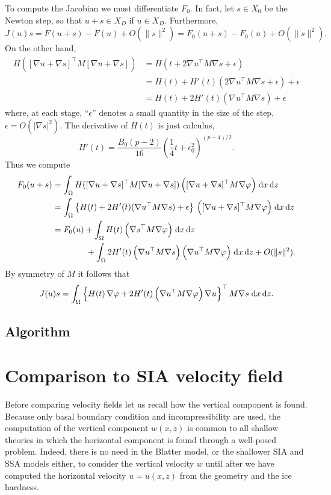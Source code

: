 \documentclass[11pt,final,reqno]{amsart}
\theoremstyle{remark}
\theoremstyle{definition}
\newcommand{\eps}{\epsilon}
\newcommand{\grad}{\nabla}
\begin{document}
To compute the Jacobian we must differentiate $F_0$.  In fact, let $s\in X_0$ be the Newton step, so that $u+s \in X_D$ if $u\in X_D$.  Furthermore,
	$$J(u) s = F(u+s) - F(u) + O(\|s\|^2) = F_0(u+s) - F_0(u) + O(\|s\|^2).$$
On the other hand,
\begin{align*}
  H([\grad u+\grad s]^\top M [\grad u+\grad s]) &= H(t + 2 \grad u^\top M \grad s + \eps) \\
      &=  H(t) + H'(t) (2 \grad u^\top M \grad s + \eps) + \eps \\
      &=  H(t) + 2 H'(t) (\grad u^\top M \grad s) + \eps
\end{align*}
where, at each stage, ``$\eps$'' denotes a small quantity in the size of the step, $\eps = O(|\grad s|^2)$.  The derivative of $H(t)$ is just calculus,
   $$H'(t) = \frac{B_0(p-2)}{16} \left(\frac{1}{4} t + \eps_0^2\right)^{(p-4)/2}.$$
Thus we compute
\begin{align*}
  F_0(u+s) &= \int_\Omega H([\grad u+\grad s]^\top M [\grad u+\grad s]) \,\Big([\grad u+\grad s]^\top M \grad \varphi\Big)\dxdz \\
           &= \int_\Omega \left\{H(t) + 2 H'(t) (\grad u^\top M \grad s) + \eps\right\} \,\Big([\grad u+\grad s]^\top M \grad \varphi\Big)\dxdz \\
           &= F_0(u) + \int_\Omega H(t) \,\Big(\grad s^\top M \grad \varphi\Big)\dxdz \\
           &\qquad\qquad + \int_\Omega 2 H'(t) \,\Big(\grad u^\top M \grad s\Big) \,\Big(\grad u^\top M \grad \varphi\Big)\dxdz + O(\|s\|^2).
\end{align*}
By symmetry of $M$ it follows that
\begin{equation}
  J(u) s = \int_\Omega \left\{H(t) \,\grad \varphi + 2 H'(t) \,\Big(\grad u^\top M \grad \varphi\Big) \, \grad u\right\}^\top M \grad s \dxdz.  \label{continuumjacobian}
\end{equation}


\subsection*{Algorithm} 



\newpage
\section{Comparison to SIA velocity field}\label{sec:sia}

Before comparing velocity fields let us recall how the vertical component is found.  Because only basal boundary condition and incompressibility are used, the computation of the vertical component $w(x,z)$ is common to all shallow theories in which the horizontal component is found through a well-posed problem.  Indeed, there is no need in the Blatter model, or the shallower SIA and SSA models either, to consider the vertical velocity $w$ until after we have computed the horizontal velocity $u=u(x,z)$ from the geometry and the ice hardness.
\end{document}
